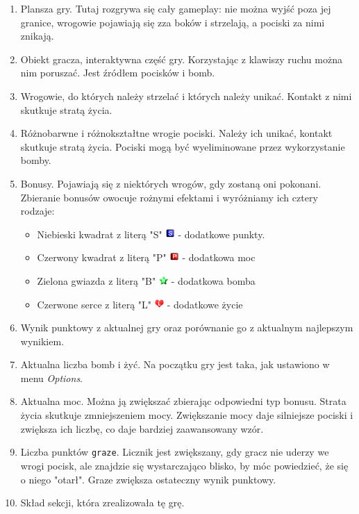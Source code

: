 		\begin{enumerate}
			\item Plansza gry. Tutaj rozgrywa się cały gameplay: nie można wyjść poza jej granice, wrogowie pojawiają się zza boków i strzelają, a pociski za nimi znikają.
			\item Obiekt gracza, interaktywna część gry. Korzystając z klawiszy ruchu można nim poruszać. Jest źródłem pocisków i bomb.
			\item Wrogowie, do których należy strzelać i których należy unikać. Kontakt z nimi skutkuje stratą życia.
			\item Różnobarwne i różnokształtne wrogie pociski. Należy ich unikać, kontakt skutkuje stratą życia. Pociski mogą być wyeliminowane przez wykorzystanie bomby.
			\item Bonusy. Pojawiają się z niektórych wrogów, gdy zostaną oni pokonani. Zbieranie bonusów owocuje rożnymi efektami i wyróżniamy ich cztery rodzaje:
			\begin{itemize}
				\item Niebieski kwadrat z literą "S" \tab \includegraphics[width=10pt]{./images/bonusScore} \tab - dodatkowe punkty.
				\item Czerwony kwadrat z literą "P" \tab \includegraphics[width=10pt]{./images/bonusPower} \tab - dodatkowa moc
				\item Zielona gwiazda z literą "B" \tab \includegraphics[width=10pt]{./images/bonusBomb} \tab - dodatkowa bomba
				\item Czerwone serce z literą "L" \tab \includegraphics[width=10pt]{./images/bonusLife} \tab - dodatkowe życie
			\end{itemize}
			\item Wynik punktowy z aktualnej gry oraz porównanie go z aktualnym najlepszym wynikiem.
			\item Aktualna liczba bomb i żyć. Na początku gry jest taka, jak ustawiono w menu \emph{Options}.
			\item Aktualna moc. Można ją zwiększać zbierając odpowiedni typ bonusu. Strata życia skutkuje zmniejszeniem mocy. Zwiększanie mocy daje silniejsze pociski i zwiększa ich liczbę, co daje bardziej zaawansowany wzór.
			\item Liczba punktów \texttt{graze}. Licznik jest zwiększany, gdy gracz nie uderzy we wrogi pocisk, ale znajdzie się wystarczająco blisko, by móc powiedzieć, że się o niego "otarł". Graze zwiększa ostateczny wynik punktowy.
			\item Skład sekcji, która zrealizowała tę grę.
		\end{enumerate}
		
		
		
		
		
		
